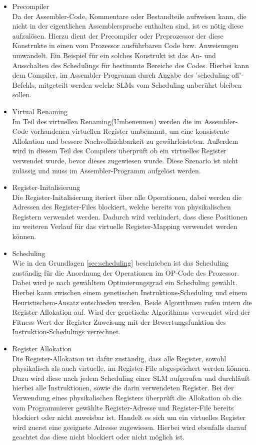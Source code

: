 \begin{itemize}
	\item Precompiler\\
		Da der Assembler-Code, Kommentare oder Bestandteile aufweisen kann, die nicht in der eigentlichen Assemblersprache enthalten sind, ist es nötig diese aufzulösen. Hierzu dient der Precompiler oder Preprozessor der diese Konstrukte in einen vom Prozessor ausführbaren Code bzw. Anweisungen umwandelt. Ein Beispiel für ein solches Konstrukt ist das An- und Ausschalten des Schedulings für bestimmte Bereiche des Codes. Hierbei kann dem Compiler, im Assembler-Programm durch Angabe des 'scheduling-off'-Befehls, mitgeteilt werden welche SLMs vom Scheduling unberührt bleiben sollen.
	\item Virtual Renaming\\
		Im Teil des virtuellen Renaming(Umbenennen) werden die im Assembler-Code vorhandenen virtuellen Register umbenannt, um eine konsistente Allokation und bessere Nachvollziehbarkeit zu gewährleisteten. Außerdem wird in diesem Teil des Compilers überprüft ob ein virtuelles Register verwendet wurde, bevor dieses zugewiesen wurde. Diese Szenario ist nicht zulässig und muss im Assembler-Programm aufgelöst werden.
	\item Register-Initalisierung\\
		Die Register-Initalisierung iteriert über alle Operationen, dabei werden die Adressen des Register-Files blockiert, welche bereits von physikalischen Registern verwendet werden. Dadurch wird verhindert, dass diese Positionen im weiteren Verlauf für das virtuelle Register-Mapping verwendet werden können.
	\item Scheduling\\
		Wie in den Grundlagen \ref{sec:scheduling} beschrieben  ist das Scheduling zuständig für die Anordnung der Operationen im OP-Code des Prozessor. Dabei wird je nach gewähltem Optimierungsgrad ein Scheduling gewählt. Hierbei kann zwischen einem genetischen Instruktions-Scheduling und einem Heuristischem-Ansatz entschieden werden. Beide Algorithmen rufen intern die Register-Allokation auf. Wird der genetische Algorithmus verwendet wird der Fitness-Wert der Register-Zuweisung mit der Bewertungsfunktion des Instruktion-Schedulings verrechnet.
	\item Register Allokation\\
		Die Register-Allokation ist dafür zuständig, dass alle Register, sowohl physikalisch als auch virtuelle, im Register-File abgespeichert werden können. Dazu wird diese nach jedem Scheduling einer SLM aufgerufen und durchläuft hierbei alle Instruktionen, sowie die darin verwendeten Register. Bei der Verwendung eines physikalischen Registers überprüft die Allokation ob die vom Programmierer gewählte Register-Adresse und Register-File bereits blockiert oder nicht zuweisbar ist. Handelt es sich um ein virtuelles Register wird zuerst eine geeignete Adresse zugewiesen. Hierbei wird ebenfalls darauf geachtet das diese nicht blockiert oder nicht möglich ist.

\end{itemize}
